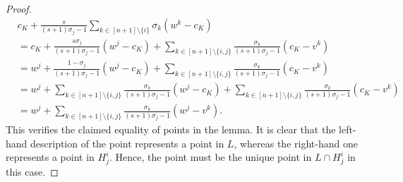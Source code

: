 \documentclass{amsart}
\begin{document}
\begin{proof}
\begin{align*}
	& c_K + \frac{s}{(s+1) \sigma_j - 1} \sum_{k \in [n+1] \setminus \{i\}} \sigma_k (w^k - c_K)
	\\
	& = c_K + \frac{s \sigma_j}{(s+1) \sigma_j - 1} (w^j - c_K)
		+ \sum_{k \in [n+1] \setminus \{i,j\}} \frac{\sigma_k}{(s+1) \sigma_j - 1} (c_K - v^k)
	\\
	& = w^j + \frac{1 - \sigma_j}{(s+1) \sigma_j - 1} (w^j - c_K)
		+ \sum_{k \in [n+1] \setminus \{i,j\}} \frac{\sigma_k}{(s+1) \sigma_j - 1} (c_K - v^k)
	\\
	& = w^j + \sum_{k \in [n+1] \setminus \{i,j\}} \frac{\sigma_k}{(s+1) \sigma_j - 1} (w^j - c_K)
		+ \sum_{k \in [n+1] \setminus \{i,j\}} \frac{\sigma_k}{(s+1) \sigma_j - 1} (c_K - v^k)
	\\
	& = w^j + \sum_{k \in [n+1] \setminus \{i,j\}} \frac{\sigma_k}{(s+1) \sigma_j - 1} (w^j - v^k).
\end{align*}
This verifies the claimed equality of points in the lemma.
It is clear that the left-hand description of the point represents a point in $L$,
whereas the right-hand one represents a point in $H^i_j$.
Hence, the point must be the unique point in $L \cap H^i_j$ in this case.
\end{proof}
\end{document}
